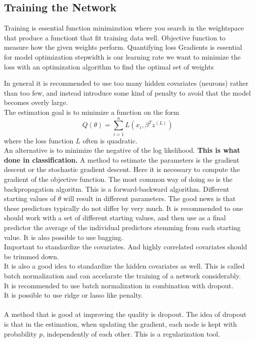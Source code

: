 




\subsection{Training the Network}


Training is essential function minimization where you search in the weightspace that produce a functiont that fit training data well. Objective function to measure how the given weights perform.
Quantifying loss
Gradients is essential for model optimization
stepwidth is our learning rate
we want to minimize the loss with an optimization algorithm to find the optimal set of weights

In general it is recommended to use too many hidden covariates (neurons) rather than too few, and instead introduce some kind of penalty to avoid that the model becomes overly large.
\\
The estimation goal is to minimize a function on the form
$$Q(\theta) = \sum_{i=1}^n L(x_i, \beta^T z^{(L)})$$
where the loss function $L$ often is quadratic.\\
An alternative is to minimize the negative of the log likelihood. \textbf{This is what done in classification.}
A method to estimate the parameters is the gradient descent or the stochastic gradient descent. Here it is necessary to compute the gradient of the objective function. The most common way of doing so is the backpropagation algoritm. This is a forward-backward algorithm. Different starting values of $\theta$ will result in different parameters. The good news is that these predictors typically do not differ by very much. It is recommended to one should work with a set of different starting values, and then use as a final predictor the average of the individual predictors stemming from each starting value. It is also possible to use bagging.
\\
Important to standardize the covariates. And highly correlated covariates should be trimmed down.\\
It is also a good idea to standardize the hidden covariates as well. This is called batch normalization and can accelarate the training of a network considerably.
\\
It is recommended to use batch normalization  in combination with dropout.
\\
It is possible to use ridge or lasso like penalty.
\\
\\
A method that is good at improving the quality is dropout. The idea of dropout is that in the estimation, when updating the gradient, each node is kept with probability $p$, independently of each other. This is a regularization tool.\\

